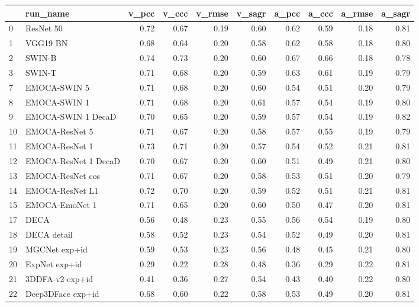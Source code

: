 \begin{tabular}{llrrrrrrrr}
\toprule
{} &              run\_name &  v\_pcc &  v\_ccc &  v\_rmse &  v\_sagr &  a\_pcc &  a\_ccc &  a\_rmse &  a\_sagr \\
\midrule
0  &             ResNet 50 &   0.72 &   0.67 &    0.19 &    0.60 &   0.62 &   0.59 &    0.18 &    0.81 \\
1  &              VGG19 BN &   0.68 &   0.64 &    0.20 &    0.58 &   0.62 &   0.58 &    0.18 &    0.80 \\
2  &                SWIN-B &   0.74 &   0.73 &    0.20 &    0.60 &   0.67 &   0.66 &    0.18 &    0.78 \\
3  &                SWIN-T &   0.71 &   0.68 &    0.20 &    0.59 &   0.63 &   0.61 &    0.19 &    0.79 \\
7  &          EMOCA-SWIN 5 &   0.71 &   0.68 &    0.20 &    0.60 &   0.54 &   0.51 &    0.20 &    0.79 \\
8  &          EMOCA-SWIN 1 &   0.71 &   0.68 &    0.20 &    0.61 &   0.57 &   0.54 &    0.19 &    0.80 \\
9  &    EMOCA-SWIN 1 DecaD &   0.70 &   0.65 &    0.20 &    0.59 &   0.57 &   0.54 &    0.19 &    0.82 \\
10 &        EMOCA-ResNet 5 &   0.71 &   0.67 &    0.20 &    0.58 &   0.57 &   0.55 &    0.19 &    0.79 \\
11 &        EMOCA-ResNet 1 &   0.73 &   0.71 &    0.20 &    0.57 &   0.54 &   0.52 &    0.21 &    0.81 \\
12 &  EMOCA-ResNet 1 DecaD &   0.70 &   0.67 &    0.20 &    0.60 &   0.51 &   0.49 &    0.21 &    0.80 \\
13 &      EMOCA-ResNet cos &   0.71 &   0.67 &    0.20 &    0.58 &   0.53 &   0.51 &    0.20 &    0.79 \\
14 &       EMOCA-ResNet L1 &   0.72 &   0.70 &    0.20 &    0.59 &   0.52 &   0.51 &    0.21 &    0.81 \\
15 &        EMOCA-EmoNet 1 &   0.71 &   0.65 &    0.20 &    0.60 &   0.50 &   0.47 &    0.20 &    0.81 \\
17 &                  DECA &   0.56 &   0.48 &    0.23 &    0.55 &   0.56 &   0.54 &    0.19 &    0.80 \\
18 &           DECA detail &   0.58 &   0.52 &    0.23 &    0.54 &   0.52 &   0.49 &    0.20 &    0.81 \\
19 &         MGCNet exp+id &   0.59 &   0.53 &    0.23 &    0.56 &   0.48 &   0.45 &    0.21 &    0.80 \\
20 &         ExpNet exp+id &   0.29 &   0.22 &    0.28 &    0.48 &   0.36 &   0.29 &    0.22 &    0.81 \\
21 &       3DDFA-v2 exp+id &   0.41 &   0.36 &    0.27 &    0.54 &   0.43 &   0.40 &    0.22 &    0.80 \\
22 &     Deep3DFace exp+id &   0.68 &   0.60 &    0.22 &    0.58 &   0.53 &   0.49 &    0.20 &    0.81 \\
\bottomrule
\end{tabular}
